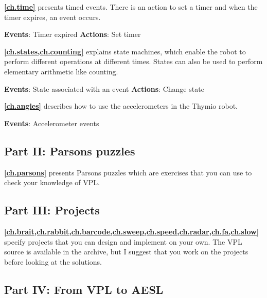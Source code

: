 \medskip

\textbf{\cref{ch.time}} presents timed events. There is an action
to set a timer and when the timer expires, an event occurs.

\textbf{Events}: Timer expired \hfill \textbf{Actions}: Set timer

 \hfill {}

\medskip

\textbf{\cref{ch.states,ch.counting}} explains state machines, which
enable the robot to perform different operations at different times.
States can also be used to perform elementary arithmetic like counting.

\textbf{Events}: State associated with an event \hfill \textbf{Actions}:
Change state

 \hfill {}

\medskip

\textbf{\cref{ch.angles}} describes how to use the accelerometers
in the Thymio robot.

\textbf{Events}: Accelerometer events

 \quad {}

\medskip

\subsection*{Part II: Parsons puzzles}

\textbf{\cref{ch.parsons}} presents Parsons puzzles which are exercises
that you can use to check your knowledge of VPL.

\medskip

\subsection*{Part III: Projects}

\textbf{\cref{ch.brait,ch.rabbit,ch.barcode,ch.sweep,ch.speed,ch.radar,ch.fa,ch.slow}}
specify projects that you can design and implement on your own.
The VPL source is available in the archive, but I suggest that you work
on the projects before looking at the solutions.

\medskip

\subsection*{Part IV: From VPL to AESL}

